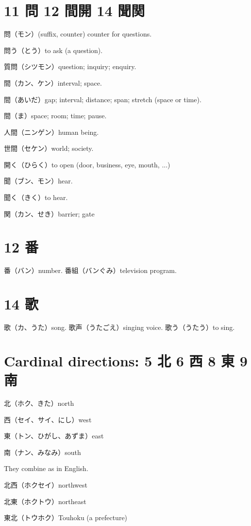 \section{11 問 12 間開 14 聞関}

問（モン）(suffix, counter) counter for questions.

問う（とう）to ask (a question).

質問（シツモン）question; inquiry; enquiry.

間（カン、ケン）interval; space.

間（あいだ）gap; interval; distance; span; stretch (space or time).

間（ま）space; room; time; pause.

人間（ニンゲン）human being.

世間（セケン）world; society.

開く（ひらく）to open (door, business, eye, mouth, ...)

聞（ブン、モン）hear.

聞く（きく）to hear.

関（カン、せき）barrier; gate

\section{12 番}

番（バン）number.
番組（バンぐみ）television program.

\section{14 歌}

歌（カ、うた）song.
歌声（うたごえ）singing voice.
歌う（うたう）to sing.

\section{Cardinal directions: 5 北 6 西 8 東 9 南}

北（ホク、きた）north

西（セイ、サイ、にし）west

東（トン、ひがし、あずま）east

南（ナン、みなみ）south

They combine as in English.

北西（ホクセイ）northwest

北東（ホクトウ）northeast

東北（トウホク）Touhoku (a prefecture)

